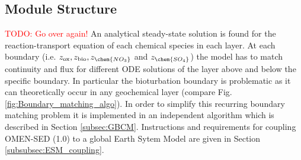 \documentclass[gmd, manuscript]{copernicus}
\begin{document}
\subsection{Module Structure}\label{subsec:module_Structure}
\textcolor{red}{TODO: Go over again!}
An analytical steady-state solution is found for the reaction-transport equation of each chemical species in each layer. 
At each boundary (i.e. $z_{\mathrm{ox}}, z_{\mathrm{bio}}, z_{\chem{NO_3}}$ and $z_{\chem{SO_4}}$) the model has to match continuity and flux for different ODE solutions of the layer above and below the specific boundary. 
In particular the bioturbation boundary is problematic as it can theoretically occur in any geochemical layer (compare Fig. \ref{fig:Boundary_matching_algo}). In order to simplify this recurring boundary matching problem it is implemented in an independent algorithm 
which is described in Section \ref{subsec:GBCM}. Instructions and requirements for coupling OMEN-SED (1.0) to a global Earth Sytem Model are given in Section \ref{subsubsec:ESM_coupling}.
\end{document}

